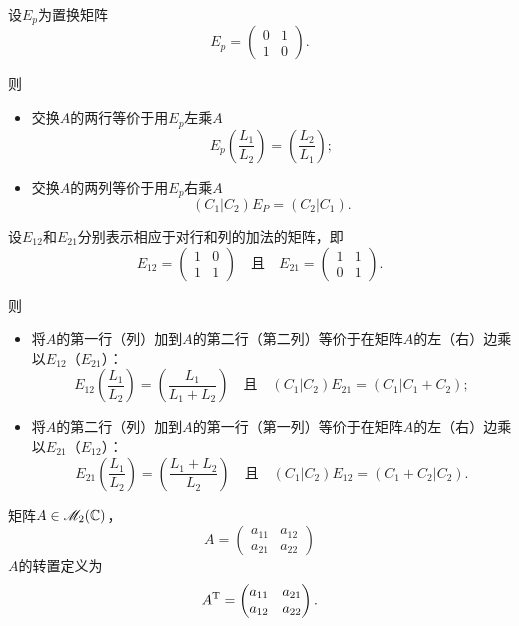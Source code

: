   设$E_p$为{\kaishu 置换矩阵}
  \[
    E_p = \begin{pmatrix}
      0 & 1 \\
      1 & 0
    \end{pmatrix}.
  \]

  则
  \begin{mybox}
    \begin{itemize}
      \item 交换$A$的两行等价于用$E_p$左乘$A$
      \[
        E_p \left( \frac{L_1}{L_2} \right)
        = \left( \frac{L_2}{L_1} \right);
      \]
      \item 交换$A$的两列等价于用$E_p$右乘$A$
      \[
        (C_1|C_2)E_P = (C_2|C_1).
      \]
    \end{itemize}
  \end{mybox}

  设$E_{12}$和$E_{21}$分别表示相应于对行和列的加法的矩阵，即
  \[
    E_{12} = \begin{pmatrix}
      1 & 0 \\
      1 & 1
    \end{pmatrix}\quad \text{且}\quad E_{21} = 
    \begin{pmatrix}
      1 & 1 \\
      0 & 1
    \end{pmatrix}.
  \]

  则
  \begin{mybox}
    \begin{itemize}
      \item 将$A$的第一行（列）加到$A$的第二行（第二列）等价于在矩阵$A$的左（右）边乘以$E_{12}$（$E_{21}$）：
          \[
            E_{12} \left( \frac{L_1}{L_2} \right)
            = \left( \frac{L_1}{L_1+L_2} \right)
            \quad \text{且}\quad
            (C_1|C_2)E_{21} = (C_1|C_1 + C_2);
          \]
      \item 将$A$的第二行（列）加到$A$的第一行（第一列）等价于在矩阵$A$的左（右）边乘以$E_{21}$（$E_{12}$）：
          \[
            E_{21} \left( \frac{L_1}{L_2} \right)
            = \left( \frac{L_1+L_2}{L_2} \right)
            \quad \text{且}\quad
            (C_1|C_2)E_{12} = (C_1 + C_2|C_2).
          \]
    \end{itemize}
  \end{mybox}

  \begin{definition}
    矩阵$A\in\mathscr M_2(\mathbb C)$，
    \[
      A = \begin{pmatrix}
        a_{11} & a_{12} \\
        a_{21} & a_{22}
      \end{pmatrix}
    \]
    $A$的{\kaishu 转置}定义为
    \[
      A^{\mathrm T} = \begin{pmatrix}
        a_{11} & a_{21} \\
        a_{12} & a_{22}
      \end{pmatrix}.
    \]
  \end{definition}

